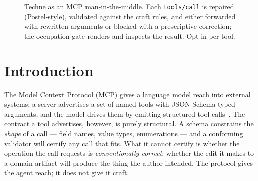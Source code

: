 \documentclass[sigconf,nonacm,screen,anonymous]{acmart}
\begin{document}
\maketitle


\begin{figure}[t]\centering
{}
\caption{Techn\=e as an MCP man-in-the-middle. Each \texttt{tools/call} is
repaired (Postel-style), validated against the craft rules, and either forwarded
with rewritten arguments or blocked with a prescriptive correction; the
occupation gate renders and inspects the result. Opt-in per tool.}
\label{fig:arch}
\end{figure}

\section{Introduction}\label{sec:intro}

The Model Context Protocol (MCP) gives a language model reach into external systems: a server advertises a set of named tools with JSON-Schema-typed arguments, and the model drives them by emitting structured tool calls~\cite{mcp,jsonschema}. The contract a tool advertises, however, is purely structural. A schema constrains the \emph{shape} of a call --- field names, value types, enumerations --- and a conforming validator will certify any call that fits. What it cannot certify is whether the operation the call requests is \emph{conventionally correct}: whether the edit it makes to a domain artifact will produce the thing the author intended. The protocol gives the agent reach; it does not give it craft.
\end{document}
